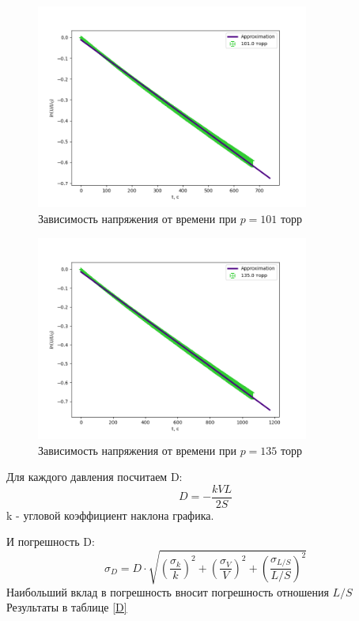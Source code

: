 \documentclass[a4paper,12pt]{article} %
\begin{document}
\begin{figure}[h!]
\begin{center}
\includegraphics[width=0.8\textwidth]{U(t)+10}
\end{center}
\caption{Зависимость напряжения от времени при $p=101$ торр} \label{u3}
\end{figure}

\begin{figure}[h!]
\begin{center}
\includegraphics[width=0.8\textwidth]{U(t)+13}
\end{center}
\caption{Зависимость напряжения от времени при $p=135$ торр} \label{u4}
\end{figure}

Для каждого давления посчитаем D:
\begin{equation}
D = -\frac{kVL}{2S}
\end{equation}
k - угловой коэффициент наклона графика.

И погрешность D:
\begin{equation}
\sigma_D = D\cdot \sqrt{(\frac{\sigma_k}{k})^2+(\frac{\sigma_V}{V})^2+(\frac{\sigma_{L/S}}{{L/S}})^2}
\end{equation}
Наибольший вклад в погрешность вносит погрешность отношения $L/S$
Результаты в таблице \ref{D}
\end{document}
